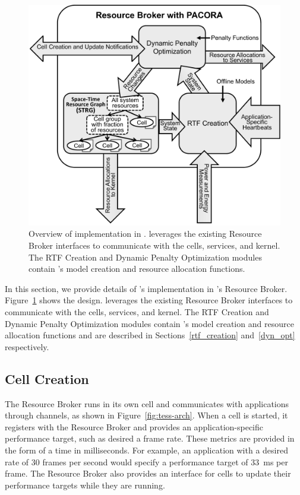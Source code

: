 \begin{figure}[t]
\centering
\includegraphics[width=0.885\linewidth]{Figures/pacora-in-tess}
\caption{
Overview of \pacora implementation in \tess.  \pacora leverages the existing Resource Broker interfaces to communicate with the cells, services, and kernel.  The RTF Creation and Dynamic Penalty Optimization modules contain \pacora's model creation and resource allocation functions.
}
\label{fig:pacora-in-tess}
\end{figure}

In this section, we provide details of \pacora's implementation in \tess's Resource Broker. Figure~\ref{fig:pacora-in-tess} shows the design. \pacora leverages the existing Resource Broker interfaces to communicate with the cells, services, and kernel.  The RTF Creation and Dynamic Penalty Optimization modules contain \pacora's model creation and resource allocation functions and are described in Sections~\ref{rtf_creation} and~\ref{dyn_opt} respectively.

\subsection{Cell Creation}

The Resource Broker runs in its own cell and communicates with
applications through channels, as shown in Figure~\ref{fig:tess-arch}.
When a cell is started, it registers with the Resource Broker and provides
an application-specific performance target, such as desired a
frame rate.  These metrics are provided in the form of a time in milliseconds.  
For example, an application with a desired rate of
30 frames per second would specify a performance target of 33~ms
per frame. 
The Resource Broker also provides
an interface for cells to update their performance targets while they are running.

